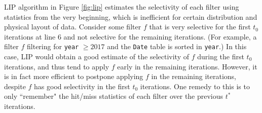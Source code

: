 \documentclass[10pt]{article}
\begin{document}
LIP algorithm in Figure \ref{fig:lip} estimates the selectivity of each filter using statistics from the very beginning, which is inefficient for certain distribution and physical layout of data. Consider some filter $f$ that is very selective for the first $t_0$ iterations at line 6 and not selective for the remaining iterations. (For example, a filter $f$ filtering for \texttt{year} $\geq 2017$ and the \texttt{Date} table is sorted in \texttt{year}.) In this case, LIP would obtain a good estimate of the selectivity of $f$ during the first $t_0$ iterations, and thus tend to apply $f$ early in the remaining iterations. However, it is in fact more efficient to postpone applying $f$ in the remaining iterations, despite $f$ has good selectivity in the first $t_0$ iterations. One remedy to this is to only ``remember" the hit/miss statistics of each filter over the previous $t^*$ iterations.
\end{document}
